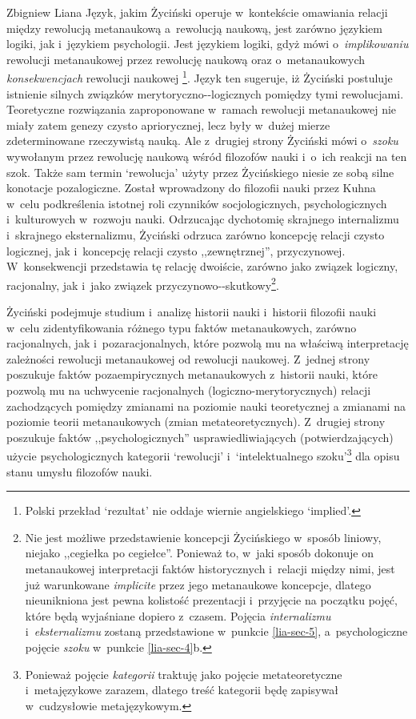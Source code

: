 \begin{artplenv}{Zbigniew Liana}
Język, jakim Życiński operuje w~kontekście omawiania relacji między rewolucją metanaukową a~rewolucją naukową, jest
zarówno językiem logiki, jak i~językiem psychologii. Jest językiem logiki, gdyż mówi o~\textit{implikowaniu} rewolucji
metanaukowej przez rewolucję naukową oraz o~metanaukowych \textit{konsekwencjach} rewolucji naukowej
\parencites[s.~8.13]{zycinski_structure_1988}[s.~15.24]{zycinski_struktura_2013}\footnote{Polski przekład `rezultat' nie oddaje
wiernie angielskiego `implied'.}. Język ten sugeruje, iż Życiński postuluje istnienie silnych związków
merytoryczno-\mbox{-logicznych} %
pomiędzy tymi rewolucjami. Teoretyczne rozwiązania zaproponowane w~ramach rewolucji
metanaukowej nie miały zatem genezy czysto apriorycznej, lecz były w~dużej mierze  zdeterminowane rzeczywistą nauką.
Ale z~drugiej strony Życiński mówi o~\textit{szoku} wywołanym przez rewolucję naukową wśród filozofów nauki i~o~ich
reakcji na ten szok. Także sam termin `rewolucja' użyty przez Życińskiego niesie ze sobą silne konotacje pozalogiczne.
Został wprowadzony do filozofii nauki przez Kuhna w~celu podkreślenia istotnej roli czynników socjologicznych,
psychologicznych i~kulturowych w~rozwoju nauki. Odrzucając dychotomię skrajnego internalizmu i~skrajnego eksternalizmu,
Życiński odrzuca zarówno koncepcję relacji czysto logicznej, jak i~koncepcję relacji czysto ,,zewnętrznej'',
przyczynowej. W~konsekwencji przedstawia tę relację dwoiście, zarówno jako związek logiczny, racjonalny, jak i~jako związek
przyczynowo-\mbox{-skutkowy}\footnote{Nie %
jest możliwe przedstawienie koncepcji Życińskiego w~sposób liniowy, niejako ,,cegiełka
po cegiełce''. Ponieważ to, w~jaki sposób dokonuje on metanaukowej interpretacji faktów historycznych i~relacji między
nimi, jest już warunkowane \textit{implicite} przez jego metanaukowe koncepcje, dlatego nieunikniona jest pewna kolistość
prezentacji i~przyjęcie na początku pojęć, które będą wyjaśniane dopiero z~czasem. Pojęcia \textit{internalizmu} i~\textit{eksternalizmu}
zostaną przedstawione w~punkcie \ref{lia-sec-5}, a~psychologiczne pojęcie \textit{szoku} w~punkcie \ref{lia-sec-4}b.}.

Życiński podejmuje studium i~analizę historii nauki i~historii filozofii nauki w~celu zidentyfikowania różnego typu
faktów metanaukowych, zarówno racjonalnych, jak i~pozaracjonalnych, które pozwolą mu na właściwą interpretację zależności
rewolucji metanaukowej od rewolucji naukowej. Z~jednej strony poszukuje faktów pozaempirycznych metanaukowych z~historii
nauki, które pozwolą mu na uchwycenie racjonalnych (logiczno-merytorycznych) relacji zachodzących pomiędzy
zmianami na poziomie nauki teoretycznej a zmianami na poziomie teorii metanaukowych (zmian metateoretycznych). Z~drugiej
strony poszukuje faktów ,,psychologicznych'' usprawiedliwiających (potwierdzających) użycie psychologicznych
kategorii `rewolucji' i~`intelektualnego szoku'\footnote{Ponieważ pojęcie \textit{kategorii} traktuję jako pojęcie
metateoretyczne i~metajęzykowe zarazem, dlatego treść kategorii będę zapisywał w~cudzysłowie metajęzykowym.} dla opisu
stanu umysłu filozofów nauki.


\end{artplenv}
